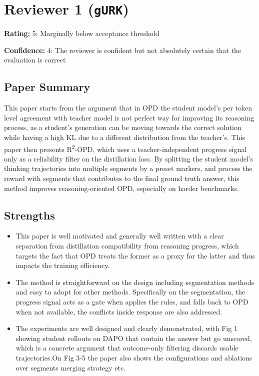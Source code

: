 \section{Reviewer 1 (\texttt{gURK})}
\label{reviewer:1}
\noindent\textbf{Rating:} 5: Marginally below acceptance threshold\par
\noindent\textbf{Confidence:} 4: The reviewer is confident but not absolutely certain that the evaluation is correct

\subsection*{Paper Summary}
This paper starts from the argument that in OPD the student model's per token level agreement with teacher model is not perfect way for improving its reasoning process, as a student's generation can be moving towards the correct solution while having a high KL due to a different distribution from the teacher's. This paper then presents R\textsuperscript{2}-OPD, which uses a teacher-independent progress signal only as a reliability filter on the distillation loss. By splitting the student model's thinking trajectories into multiple segments by a preset markers, and process the reward with segments that contributes to the final ground truth answer, this method improves reasoning-oriented OPD, especially on harder benchmarks.

\subsection*{Strengths}
\begin{itemize}
\item This paper is well motivated and generally well written with a clear separation from distillation compatibility from reasoning progress, which targets the fact that OPD treats the former as a proxy for the latter and thus impacts the training efficiency.
\item The method is straightforward on the design including segmentation methods and easy to adopt for other methods. Specifically on the segmentation, the progress signal acts as a gate when applies the rules, and falls back to OPD when not available, the conflicts inside response are also addressed.
\item The experiments are well designed and clearly demonstrated, with Fig 1 showing student rollouts on DAPO that contain the answer but go unscored, which is a concrete argument that outcome-only filtering discards usable trajectories.On Fig 3-5 the paper also shows the configurations and ablations over segments merging strategy etc.
\end{itemize}

